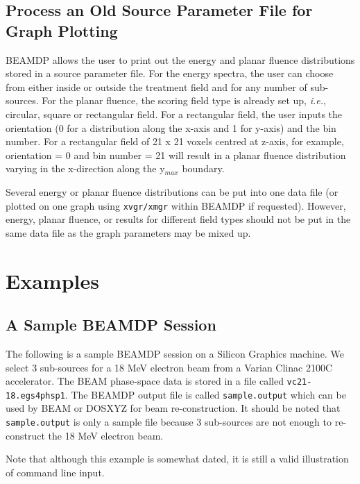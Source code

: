 \documentclass[12pt,twoside]{article}
\newcommand{\ie}{{\em i.e.}}
\begin{document}
\subsection{Process an Old Source Parameter File for Graph Plotting}
BEAMDP allows the user to print out the energy and planar fluence
distributions stored in a source parameter file. For the energy spectra,
the user can choose from either inside or outside the treatment field and
for any number of sub-sources. For the planar fluence, the scoring field
type is already set up, \ie, circular, square or rectangular field. For a
rectangular field, the user inputs the orientation (0 for a distribution
along the x-axis and 1 for y-axis) and the bin number.  For a rectangular
field of 21 x 21 voxels centred at z-axis, for example, orientation = 0
and bin number = 21 will result in a planar fluence distribution varying
in the x-direction along the y$_{max}$ boundary.

Several energy or planar fluence distributions can be put into one data file (or plotted on one graph using {\tt xvgr/xmgr} within BEAMDP if requested). However, energy, planar fluence, or results for different field types should not be put in the same data file as the graph parameters may be mixed up.
\section{Examples}

\subsection{ A Sample BEAMDP Session}

\noindent
The following is a sample BEAMDP session on a Silicon Graphics machine. We select 3 sub-sources for a 18 MeV electron beam from a Varian Clinac 2100C accelerator. The BEAM phase-space data is stored in a file called {\tt vc21-18.egs4phsp1}. The BEAMDP output file is called {\tt sample.output} which can be used by BEAM or DOSXYZ for beam re-construction. It should be noted that {\tt sample.output}  is only a sample file because 3 sub-sources are not enough to re-construct the 18 MeV electron beam.

Note that although this example is somewhat dated, it is still a valid
illustration of command line input.
\end{document}
